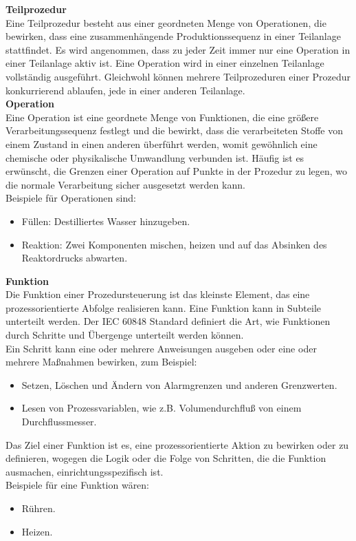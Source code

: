 \textbf{Teilprozedur}\\
Eine Teilprozedur besteht aus einer geordneten Menge von Operationen, die bewirken, dass eine zusammenhängende Produktionssequenz in einer Teilanlage stattfindet. Es wird angenommen, dass zu jeder Zeit immer nur eine Operation in einer Teilanlage aktiv ist. Eine Operation wird in einer einzelnen Teilanlage vollständig ausgeführt. Gleichwohl können mehrere Teilprozeduren einer Prozedur konkurrierend ablaufen, jede in einer anderen Teilanlage.\\

\textbf{Operation}\\
Eine Operation ist eine geordnete Menge von Funktionen, die eine größere Verarbeitungssequenz festlegt und die bewirkt, dass die verarbeiteten Stoffe von einem Zustand in einen anderen überführt werden, womit gewöhnlich eine chemische oder physikalische Umwandlung verbunden ist. Häufig ist es erwünscht, die Grenzen einer Operation auf Punkte in der Prozedur zu legen, wo die normale Verarbeitung sicher ausgesetzt werden kann.\\
Beispiele für Operationen sind:
\begin{itemize}
	\item Füllen: Destilliertes Wasser hinzugeben.
	\item Reaktion: Zwei Komponenten mischen, heizen und auf das Absinken des Reaktordrucks abwarten.
\end{itemize}

\textbf{Funktion}\\
Die Funktion einer Prozedursteuerung ist das kleinste Element, das eine prozessorientierte Abfolge realisieren kann. Eine Funktion kann in Subteile unterteilt werden. Der IEC 60848 Standard definiert die Art, wie Funktionen durch Schritte und Übergenge unterteilt werden können. \\
Ein Schritt kann eine oder mehrere Anweisungen ausgeben oder eine oder mehrere Maßnahmen bewirken, zum Beispiel:
\begin{itemize}
	\item Setzen, Löschen und Ändern von Alarmgrenzen und anderen Grenzwerten.
	\item Lesen von Prozessvariablen, wie z.B. Volumendurchfluß von einem Durchflussmesser.
\end{itemize}

Das Ziel einer Funktion ist es, eine prozessorientierte Aktion zu bewirken oder zu definieren, wogegen die Logik oder die Folge von Schritten, die die Funktion ausmachen, einrichtungsspezifisch ist.\\
Beispiele für eine Funktion wären:
\begin{itemize}
	\item Rühren.
	\item Heizen.
\end{itemize}
\cite{en61512}

